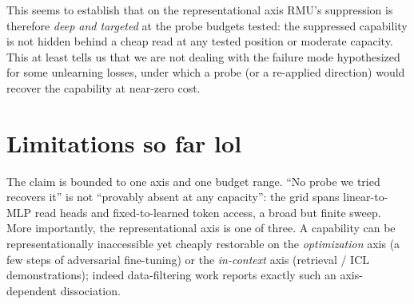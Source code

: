 \documentclass[11pt]{article}
\begin{document}
This seems to establish that on the representational axis  RMU's suppression is therefore \emph{deep and targeted}
at the probe budgets tested: the suppressed capability is not hidden behind a cheap read at
any tested position or moderate capacity. This at least tells us that we are not dealing with the
failure mode hypothesized for some unlearning losses, under which a probe (or a re-applied
direction) would recover the capability at near-zero cost.

\section{Limitations so far lol}
The claim is bounded to one axis and one budget range. ``No probe we tried recovers it'' is
not ``provably absent at any capacity'': the grid spans linear-to-MLP read heads and
fixed-to-learned token access, a broad but finite sweep. More importantly, the
representational axis is one of three. A capability can be representationally inaccessible
yet cheaply restorable on the \emph{optimization} axis (a few steps of adversarial
fine-tuning) or the \emph{in-context} axis (retrieval / ICL demonstrations); indeed
data-filtering work reports exactly such an axis-dependent dissociation.
\end{document}

